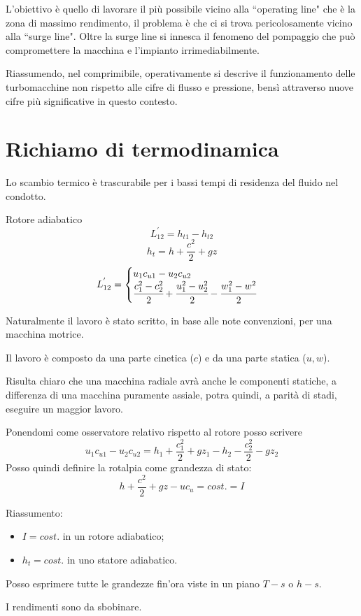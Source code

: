 L'obiettivo è quello di lavorare il più possibile vicino alla ``operating line" che è la zona di massimo rendimento, il problema è che ci si trova pericolosamente vicino alla ``surge line". Oltre la surge line si innesca il fenomeno del pompaggio che può compromettere la macchina e l'impianto irrimediabilmente.

Riassumendo, nel comprimibile, operativamente si descrive il funzionamento delle turbomacchine non rispetto alle cifre di flusso e pressione, bensì attraverso nuove cifre più significative in questo contesto.
\section{Richiamo di termodinamica}
Lo scambio termico è trascurabile per i bassi tempi di residenza del fluido nel condotto.

Rotore adiabatico
\begin{equation}
L_{12}^{'} = h_{t1}-h_{t2}
\end{equation}
\begin{equation}
h_t=h+\frac{c^2}{2}+gz
\end{equation}
\begin{equation}
L_{12}^{'} = \begin{cases} u_1 c_{u1}-u_2 c_{u2}\\
\cfrac{c_1^2-c_2^2}{2}+\cfrac{u_1^2-u_2^2}{2}-\cfrac{w_1^2-w^2}{2} \end{cases}
\end{equation}

Naturalmente il lavoro è stato scritto, in base alle note convenzioni, per una macchina motrice.

Il lavoro è composto da una parte cinetica ($c$) e da una parte statica ($u,w$). 

Risulta chiaro che una macchina radiale avrà anche le componenti statiche, a differenza di una macchina puramente assiale, potra quindi, a parità di stadi, eseguire un maggior lavoro.

Ponendomi come osservatore relativo rispetto al rotore posso scrivere
\begin{equation}
u_1 c_{u1} - u_2 c_{u2} = h_1 + \frac{c_1^2}{2}+gz_1-h_2-\frac{c_2^2}{2}-gz_2
\end{equation}
Posso quindi definire la rotalpia come grandezza di stato:
\begin{equation}
h+\frac{c^2}{2}+gz-u c_u = cost. = I
\end{equation}

Riassumento:
\begin{itemize}
\item $I=cost.$ in un rotore adiabatico;
\item $h_t=cost.$ in uno statore adiabatico.
\end{itemize}

Posso esprimere tutte le grandezze fin'ora viste in un piano $T-s$ o $h-s$.

I rendimenti sono da sbobinare.
\pagebreak